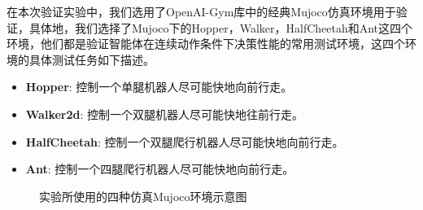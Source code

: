 在本次验证实验中，我们选用了OpenAI-Gym库中的经典Mujoco仿真环境\cite{todorov2012mujoco}用于验证，具体地，我们选择了Mujoco下的Hopper，Walker，HalfCheetah和Ant这四个环境，他们都是验证智能体在连续动作条件下决策性能的常用测试环境，这四个环境的具体测试任务如下描述。

\begin{itemize}
    \item \textbf{Hopper}: 控制一个单腿机器人尽可能快地向前行走。
    \item \textbf{Walker2d}: 控制一个双腿机器人尽可能快地往前行走。
    \item \textbf{HalfCheetah}: 控制一个双腿爬行机器人尽可能快地向前行走。
    \item \textbf{Ant}: 控制一个四腿爬行机器人尽可能快地向前行走。
\end{itemize}

\begin{figure}[H]
    \centering
    \caption{实验所使用的四种仿真Mujoco环境示意图}
    \label{fig:env-figures}
\end{figure}

